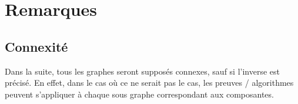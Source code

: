 
\section{Remarques}

\subsection{Connexit\'e}
Dans la suite, tous les graphes seront suppos\'es connexes, sauf si l'inverse est
pr\'ecis\'e.
En effet, dans le cas o\`u ce ne serait pas le cas, les preuves / algorithmes peuvent
s'appliquer \`a chaque sous graphe correspondant aux composantes.


